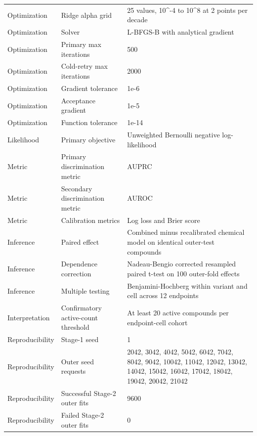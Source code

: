 \begin{longtable}{lll}
Optimization & Ridge alpha grid & 25 values, 10\textasciicircum -4 to 10\textasciicircum 8 at 2 points per decade \\
Optimization & Solver & L-BFGS-B with analytical gradient \\
Optimization & Primary max iterations & 500 \\
Optimization & Cold-retry max iterations & 2000 \\
Optimization & Gradient tolerance & 1e-6 \\
Optimization & Acceptance gradient & 1e-5 \\
Optimization & Function tolerance & 1e-14 \\
Likelihood & Primary objective & Unweighted Bernoulli negative log-likelihood \\
Metric & Primary discrimination metric & AUPRC \\
Metric & Secondary discrimination metric & AUROC \\
Metric & Calibration metrics & Log loss and Brier score \\
Inference & Paired effect & Combined minus recalibrated chemical model on identical outer-test compounds \\
Inference & Dependence correction & Nadeau-Bengio corrected resampled paired t-test on 100 outer-fold effects \\
Inference & Multiple testing & Benjamini-Hochberg within variant and cell across 12 endpoints \\
Interpretation & Confirmatory active-count threshold & At least 20 active compounds per endpoint-cell cohort \\
Reproducibility & Stage-1 seed & 1 \\
Reproducibility & Outer seed requests & 2042, 3042, 4042, 5042, 6042, 7042, 8042, 9042, 10042, 11042, 12042, 13042, 14042, 15042, 16042, 17042, 18042, 19042, 20042, 21042 \\
Reproducibility & Successful Stage-2 outer fits & 9600 \\
Reproducibility & Failed Stage-2 outer fits & 0 \\
\end{longtable}

